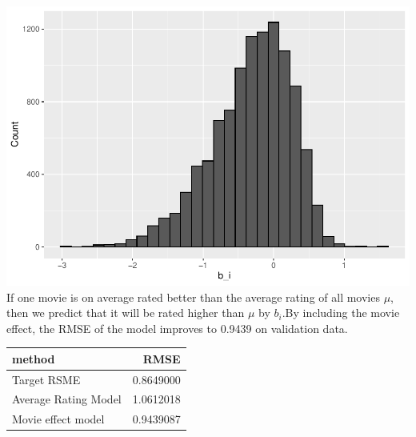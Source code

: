 \documentclass[]{article}
\newenvironment{Shaded}{\begin{snugshade}}{\end{snugshade}}
\newcommand{\CommentTok}[1]{\textcolor[rgb]{0.56,0.35,0.01}{\textit{#1}}}
\newcommand{\DataTypeTok}[1]{\textcolor[rgb]{0.13,0.29,0.53}{#1}}
\newcommand{\KeywordTok}[1]{\textcolor[rgb]{0.13,0.29,0.53}{\textbf{#1}}}
\newcommand{\NormalTok}[1]{#1}
\newcommand{\OperatorTok}[1]{\textcolor[rgb]{0.81,0.36,0.00}{\textbf{#1}}}
\newcommand{\StringTok}[1]{\textcolor[rgb]{0.31,0.60,0.02}{#1}}
\begin{document}
\includegraphics{Project_MovieLens_files/figure-latex/unnamed-chunk-24-1.pdf}
If one movie is on average rated better than the average rating of all
movies \(\mu\), then we predict that it will be rated higher than
\(\mu\) by \(b_{i}\).By including the movie effect, the RMSE of the
model improves to 0.9439 on validation data.

\begin{Shaded}
\end{Shaded}

\begin{longtable}[]{@{}lr@{}}
\toprule
method & RMSE\tabularnewline
\midrule
\endhead
Target RSME & 0.8649000\tabularnewline
Average Rating Model & 1.0612018\tabularnewline
Movie effect model & 0.9439087\tabularnewline
\bottomrule
\end{longtable}
\end{document}

